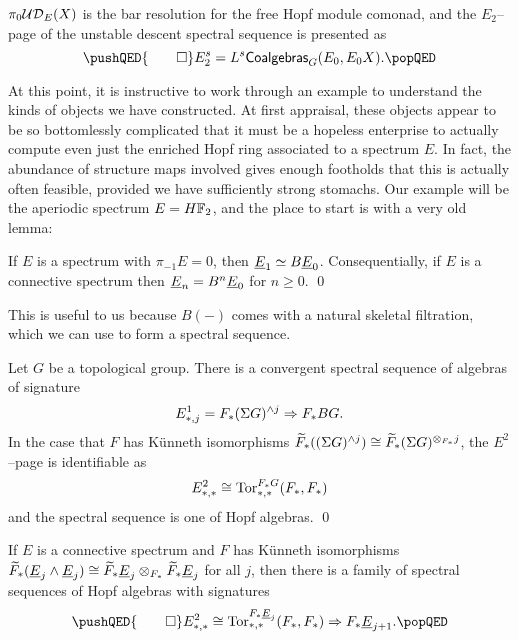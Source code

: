 \begin{theorem}
$\pi_0 \mathcal{UD}_E(X)$ is the bar resolution for the free Hopf module comonad, and the $E_2$--page of the unstable descent spectral sequence is presented as
\[\pushQED{\qed}
E_2^{s} = L^s\CatOf{Coalgebras}_G(E_0, E_0 X). \qedhere
\popQED
\]
\end{theorem}

At this point, it is instructive to work through an example to understand the kinds of objects we have constructed.  At first appraisal, these objects appear to be so bottomlessly complicated that it must be a hopeless enterprise to actually compute even just the enriched Hopf ring associated to a spectrum $E$.  In fact, the abundance of structure maps involved gives enough footholds that this is actually often feasible, provided we have sufficiently strong stomachs.  Our example will be the aperiodic spectrum $E = \HFtwo$, and the place to start is with a very old lemma:
\begin{lemma}
If $E$ is a spectrum with $\pi_{-1} E = 0$, then $\underline{\smash{E}}_{1} \simeq B\underline{\smash{E}}_{0}$.  Consequentially, if $E$ is a connective spectrum then $\underline{\smash{E}}_{n} = B^n \underline{\smash{E}}_{0}$ for $n \ge 0$. \qed
\end{lemma}
\noindent This is useful to us because $B(-)$ comes with a natural skeletal filtration, which we can use to form a spectral sequence.
\begin{lemma}
Let $G$ be a topological group.  There is a convergent spectral sequence of algebras of signature \[E^1_{*, j} = F_*(\Sigma G)^{\wedge j} \Rightarrow F_* BG.\]  In the case that $F$ has K\"unneth isomorphisms $\widetilde F_*((\Sigma G)^{\wedge j}) \cong \widetilde F_*(\Sigma G)^{\otimes_{F_*} j}$, the $E^2$--page is identifiable as \[E^2_{*, *} \cong \operatorname{Tor}^{F_* G}_{*, *}(F_*, F_*)\] and the spectral sequence is one of Hopf algebras. \qed
\end{lemma}
\begin{corollary}
If $E$ is a connective spectrum and $F$ has K\"unneth isomorphisms $\widetilde F_*(\underline{\smash{E}}_{j} \wedge \underline{\smash{E}}_{j}) \cong \widetilde F_* \underline{\smash{E}}_{j} \otimes_{F_*} \widetilde F_* \underline{\smash{E}}_{j}$ for all $j$, then there is a family of spectral sequences of Hopf algebras with signatures
\[
\pushQED{\qed}
E^2_{*, *} \cong \Tor^{F_* \OS{E}{j}}_{*, *}(F_*, F_*) \Rightarrow F_* \OS{E}{j+1}. \qedhere
\popQED
\]
\end{corollary}

